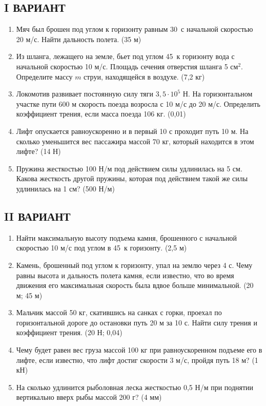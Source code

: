 \documentclass[a5paper, 10pt]{diss_4}
\renewcommand{\'}{\,'}
\begin{document}
\subsection{I ВАРИАНТ}
\begin{enumerate}

\item Мяч был брошен под углом к горизонту равным 30\textdegree\ с начальной скоростью 20 м/с. Найти дальность полета.
(35 м)
\item Из шланга, лежащего на земле, бьет под углом 45\textdegree\ к горизонту вода с начальной скоростью 10 м/с. Площадь сечения отверстия шланга 5 $см^2$. Определите массу $m$ струи, находящейся в воздухе.
(7,2 кг)
\item Локомотив развивает постоянную силу тяги $3,5\cdot10^5$ Н. На горизонтальном участке пути 600 м скорость поезда возросла с 10 м/с до 20 м/с. Определить коэффициент трения, если масса поезда 106 кг.
(0,01)
\item Лифт опускается равноускоренно и в первый 10 с проходит путь 10 м. На сколько уменьшится вес пассажира массой 70 кг, который находится в этом лифте?
(14 Н)
\item Пружина жесткостью 100 Н/м под действием силы удлинилась на 5 см. Какова жесткость другой пружины, которая под действием такой же силы удлинилась на 1 см?
(500 Н/м)

\end{enumerate}



\subsection{II ВАРИАНТ}
\begin{enumerate}

\item Найти максимальную высоту подъема камня, брошенного с начальной скоростью 10 м/с под углом в 45\textdegree\ к горизонту.
(2,5 м)
\item Камень, брошенный под углом к горизонту, упал на землю через 4 с. Чему равны высота и дальность полета камня, если известно, что во время движения его максимальная скорость была вдвое больше минимальной.
(20 м;    45 м)
\item Мальчик массой 50 кг, скатившись на санках с горки, проехал по горизонтальной дороге до остановки путь 20 м за 10 с. Найти силу трения и коэффициент трения.
(20 Н;    0,04)
\item Чему будет равен вес груза массой 100 кг при равноускоренном подъеме его в лифте, если известно, что лифт достиг скорости 3 м/с, пройдя путь 18 м?
(1 кН)
\item На сколько удлинится рыболовная леска жесткостью 0,5 Н/м при поднятии вертикально вверх рыбы массой 200 г?
(4 мм)

\end{enumerate}
\end{document}

